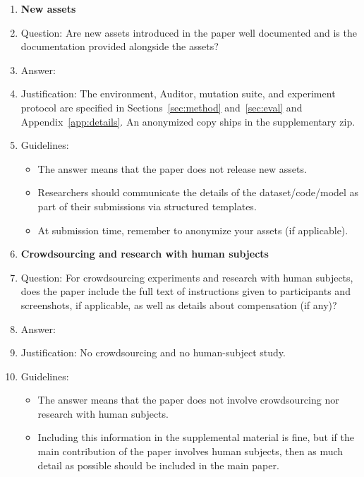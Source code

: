 \begin{enumerate}
\item {\bf New assets}
    \item[] Question: Are new assets introduced in the paper well documented and is the documentation provided alongside the assets?
    \item[] Answer: \answerYes{}
    \item[] Justification: The environment, Auditor, mutation suite, and experiment protocol are specified in Sections~\ref{sec:method} and~\ref{sec:eval} and Appendix~\ref{app:details}. An anonymized copy ships in the supplementary zip.
    \item[] Guidelines:
    \begin{itemize}
        \item The answer \answerNA{} means that the paper does not release new assets.
        \item Researchers should communicate the details of the dataset\slash code\slash model as part of their submissions via structured templates.
        \item At submission time, remember to anonymize your assets (if applicable).
    \end{itemize}

\item {\bf Crowdsourcing and research with human subjects}
    \item[] Question: For crowdsourcing experiments and research with human subjects, does the paper include the full text of instructions given to participants and screenshots, if applicable, as well as details about compensation (if any)?
    \item[] Answer: \answerNA{}
    \item[] Justification: No crowdsourcing and no human-subject study.
    \item[] Guidelines:
    \begin{itemize}
        \item The answer \answerNA{} means that the paper does not involve crowdsourcing nor research with human subjects.
        \item Including this information in the supplemental material is fine, but if the main contribution of the paper involves human subjects, then as much detail as possible should be included in the main paper.
    \end{itemize}


\end{enumerate}
